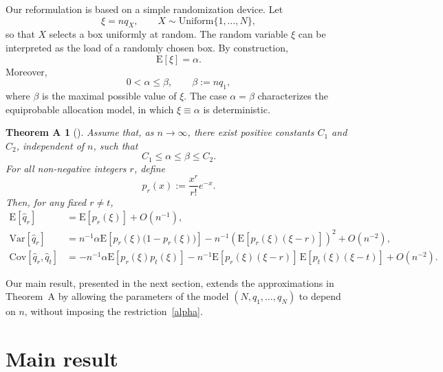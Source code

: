 \documentclass[12]{article}
\newtheorem*{theoremA}{Theorem A}
\newcommand{\rE}{\mathrm{E}} %
\newcommand{\rV}{\mathrm{Var}} %
\newcommand{\rC}{\mathrm{Cov}} %
\begin{document}
Our reformulation is based on a simple randomization device. Let
\[
\xi = n q_X, \qquad X \sim \mathrm{Uniform}\{1,\ldots,N\},
\]
so that $X$ selects a box uniformly at random. The random variable $\xi$ can be interpreted as the load of a randomly chosen box. By construction,
\[
\rE[\xi] = \alpha.
\]
Moreover,
\[
0 < \alpha \le \beta, \qquad \beta := n q_1,
\]
where $\beta$ is the maximal possible value of $\xi$. The case $\alpha = \beta$ characterizes the equiprobable allocation model, in which $\xi \equiv \alpha$ is deterministic.

\begin{theoremA}[\cite{KSC}]
Assume that, as $n \to \infty$, there exist positive constants $C_1$ and $C_2$, independent of $n$, such that
\begin{equation}\label{alpha}
C_1 \le \alpha \le \beta \le C_2.
\end{equation}
For all non-negative integers $r$, define
\[
p_{r}(x) := \frac{x^r}{r!} e^{-x}.
\]
Then, for any fixed $r \ne t$,
\begin{align*}
\rE[\hat q_r] &= \rE[p_{r}(\xi)] + O(n^{-1}),\\
\rV[\hat q_r] &= n^{-1}\alpha \rE\!\left[p_{r}(\xi)\bigl(1 - p_{r}(\xi)\bigr)\right]
               - n^{-1}\!\left(\rE\!\left[p_{r}(\xi)(\xi - r)\right]\right)^2
               + O(n^{-2}),\\
\rC[\hat q_r,\hat q_t] &= -n^{-1}\alpha \rE[p_{r}(\xi)p_{t}(\xi)]
                         - n^{-1}\rE[p_{r}(\xi)(\xi - r)]\,
                           \rE[p_{t}(\xi)(\xi - t)]
                         + O(n^{-2}).
\end{align*}
\end{theoremA}

Our main result, presented in the next section, extends the approximations in Theorem~A by allowing the parameters of the model $(N, q_1, \ldots, q_N)$ to depend on $n$, without imposing the restriction~\eqref{alpha}.

\section{Main result}\label{Mn}
\end{document}
